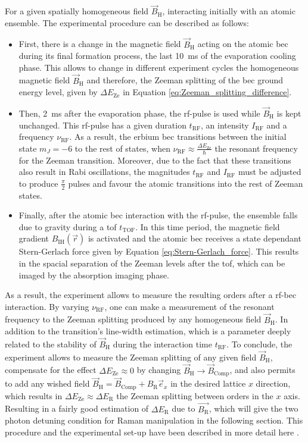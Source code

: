 For a given spatially homogeneous field $\vec{B}_\text{H}$, interacting initially with an atomic ensemble. The experimental procedure can be described as follows:
\begin{itemize}
	\item First, there is a change in the magnetic field $\vec{B}_\text{H}$ acting on the atomic \ac{bec} during its final formation process, the last \SI{10}{\milli\second} of the evaporation cooling phase. This allows to change in different experiment cycles the homogeneous magnetic field $\vec{B}_\text{H}$ and therefore, the Zeeman splitting of the \ac{bec} ground energy level, given by $\Delta E_\text{Ze}$ in Equation \eqref{eq:Zeeman_splitting_difference}.
	\item Then, \SI{2}{\milli\second} after the evaporation phase, the \ac{rf}-pulse is used while $\vec{B}_\text{H}$ is kept unchanged. This \ac{rf}-pulse has a given duration $t_\text{RF}$, an intensity $I_\text{RF}$ and a frequency $\nu_\text{RF}$. As a result, the erbium \ac{bec} transitions between the initial state $m_J=-6$ to the rest of states, when $\nu_\text{RF}\approx\frac{\Delta E_\text{Ze}}{\hbar}$ the resonant frequency for the Zeeman transition. Moreover, due to the fact that these transitions also result in Rabi oscillations, the magnitudes $t_\text{RF}$ and $I_\text{RF}$ must be adjusted to produce $\frac{\pi}{2}$ pulses and favour the atomic transitions into the rest of Zeeman states.
	\item Finally, after the atomic \ac{bec} interaction with the \ac{rf}-pulse, the ensemble falls due to gravity during a \acl{tof} $t_\text{TOF}$. In this time period, the magnetic field gradient $B_\text{IH}(\vec{r})$ is activated and the atomic \ac{bec} receives a state dependant Stern-Gerlach force given by Equation \eqref{eq:Stern-Gerlach_force}. This results in the spacial separation of the Zeeman levels after the \ac{tof}, which can be imaged by the absorption imaging phase.
\end{itemize}

As a result, the experiment allows to measure the resulting orders after a \ac{rf}-\ac{bec} interaction. By varying $\nu_\text{RF}$, one can make a measurement of the resonant frequency to the Zeeman splitting produced by any homogeneous field $\vec{B}_\text{H}$. In addition to the transition's line-width estimation, which is a parameter deeply related to the stability of $\vec{B}_\text{H}$ during the interaction time $t_\text{RF}$. To conclude, the experiment allows to measure the Zeeman splitting of any given field $\vec{B}_\text{H}$, compensate for the effect $\Delta E_\text{Ze}\approx0$ by changing $\vec{B}_\text{H}\rightarrow \vec{B}_\text{Comp}$, and also permits to add any wished field $\vec{B}_\text{H} = \vec{B}_\text{Comp} + B_{\text{R}} \vec{e}_x$ in the desired lattice $x$ direction, which results in $\Delta E_\text{Ze}\approx\Delta E_\text{R}$ the Zeeman splitting between orders in the $x$ axis. Resulting in a fairly good estimation of $\Delta E_\text{R}$ due to $\vec{B_{\text{R}}}$, which will give the two photon detuning condition for Raman manipulation in the following section. This procedure and the experimental set-up have been described in more detail here \cite{Ulitzsch2016}.

